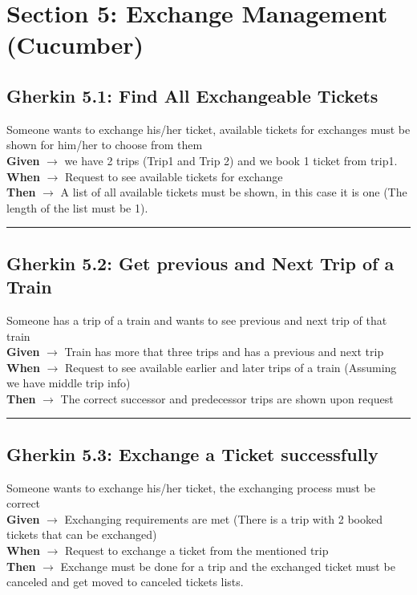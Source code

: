 \documentclass{article}
\begin{document}
\pagebreak

\section{Section 5: Exchange Management (Cucumber)}
\bigskip
\bigskip
\subsection{Gherkin 5.1: Find All Exchangeable Tickets}

Someone wants to exchange his/her ticket, available tickets for exchanges must be shown for him/her to choose from them\\
\textbf{Given} $\rightarrow$ we have 2 trips (Trip1 and Trip 2) and we book 1 ticket from trip1. \\
\textbf{When} $\rightarrow$ Request to see available tickets for exchange \\
\textbf{Then} $\rightarrow$ A list of all available tickets must be shown, in this case it is one (The length of the list must be 1).

\bigskip
\hrule
\bigskip

\subsection{Gherkin 5.2: Get previous and Next Trip of a Train}

Someone has a trip of a train and wants to see previous and next trip of that train\\
\textbf{Given} $\rightarrow$ Train has more that three trips and has a previous and next trip \\
\textbf{When} $\rightarrow$ Request to see available earlier and later trips of a train (Assuming we have middle trip info)\\
\textbf{Then} $\rightarrow$ The correct successor and predecessor trips are shown upon request

\bigskip
\hrule
\bigskip

\subsection{Gherkin 5.3: Exchange a Ticket successfully}

Someone wants to exchange his/her ticket, the exchanging process must be correct\\
\textbf{Given} $\rightarrow$ Exchanging requirements are met (There is a trip with 2 booked tickets that can be exchanged) \\
\textbf{When} $\rightarrow$ Request to exchange a ticket from the mentioned trip \\
\textbf{Then} $\rightarrow$ Exchange must be done for a trip and the exchanged ticket must be canceled and get moved to canceled tickets lists.
\end{document}
